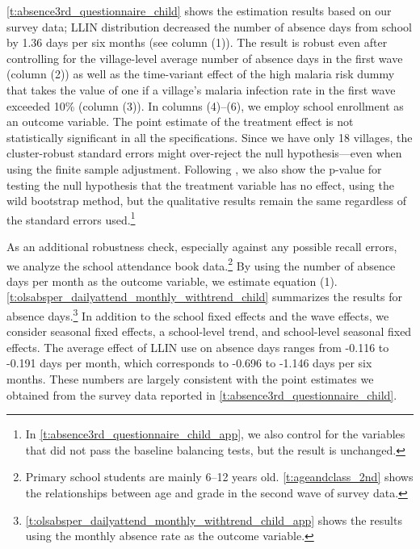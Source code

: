 \documentclass[fleqn,11pt]{article}
\begin{document}
\autoref{t:absence3rd_questionnaire_child} shows the estimation results based on our survey data; LLIN distribution decreased the number of absence days from school by 1.36 days per six months (see column (1)). The result is robust even after controlling for the village-level average number of absence days in the first wave (column (2)) as well as the time-variant effect of the high malaria risk dummy that takes the value of one if a village's malaria infection rate in the first wave exceeded 10\% (column (3)). In columns (4)--(6), we employ school enrollment as an outcome variable. The point estimate of the treatment effect is not statistically significant in all the specifications. Since we have only 18 villages, the cluster-robust standard errors might over-reject the null hypothesis---even when using the finite sample adjustment. Following \cite{cameron_bootstrap-based_2008}, we also show the p-value for testing the null hypothesis that the treatment variable has no effect, using the wild bootstrap method, but the qualitative results remain the same regardless of the standard errors used.\footnote{In \autoref{t:absence3rd_questionnaire_child_app}, we also control for the variables that did not pass the baseline balancing tests, but the result is unchanged.} 

As an additional robustness check, especially against any possible recall errors, we analyze the school attendance book data.\footnote{Primary school students are mainly 6--12 years old.
\autoref{t:ageandclass_2nd} shows the relationships between age and grade
in the second wave of survey data.} By using the number of absence days per month as the outcome variable, we estimate equation (1). 
\autoref{t:olsabsper_dailyattend_monthly_withtrend_child} summarizes the results for absence days.\footnote{\autoref{t:olsabsper_dailyattend_monthly_withtrend_child_app} shows the results using the monthly absence rate as the outcome variable.} In addition to the school fixed effects and the wave effects, we consider seasonal fixed effects, a school-level trend, and school-level seasonal fixed effects.
The average effect of LLIN use on absence days ranges from -0.116 to -0.191 days per month, which corresponds to -0.696 to -1.146 days per six months. These numbers are largely consistent with the point estimates we obtained from the survey data reported in \autoref{t:absence3rd_questionnaire_child}. 
 
\end{document}
